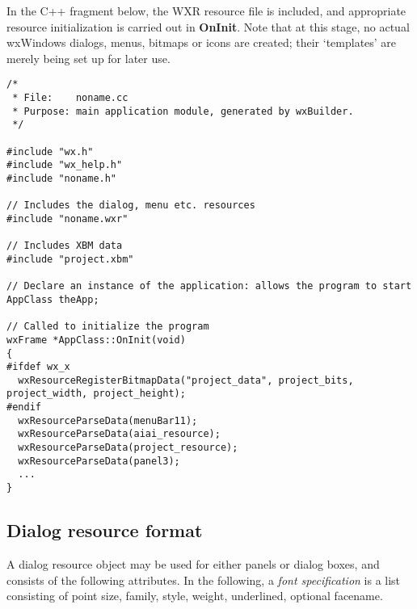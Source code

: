 In the C++ fragment below, the WXR resource file is included,
and appropriate resource initialization is carried out in {\bf OnInit}.
Note that at this stage, no actual wxWindows dialogs, menus, bitmaps or
icons are created; their `templates' are merely being set up for later
use.

\begin{verbatim}
/*
 * File:    noname.cc
 * Purpose: main application module, generated by wxBuilder.
 */

#include "wx.h"
#include "wx_help.h"
#include "noname.h"

// Includes the dialog, menu etc. resources
#include "noname.wxr"

// Includes XBM data
#include "project.xbm"

// Declare an instance of the application: allows the program to start
AppClass theApp;

// Called to initialize the program
wxFrame *AppClass::OnInit(void)
{
#ifdef wx_x
  wxResourceRegisterBitmapData("project_data", project_bits, project_width, project_height);
#endif
  wxResourceParseData(menuBar11);
  wxResourceParseData(aiai_resource);
  wxResourceParseData(project_resource);
  wxResourceParseData(panel3);
  ...
}
\end{verbatim}


\subsection{Dialog resource format}

A dialog resource object may be used for either panels or dialog boxes, and
consists of the following attributes. In the following, a {\it font specification}\rtfsp
is a list consisting of point size, family, style, weight, underlined, optional facename.

